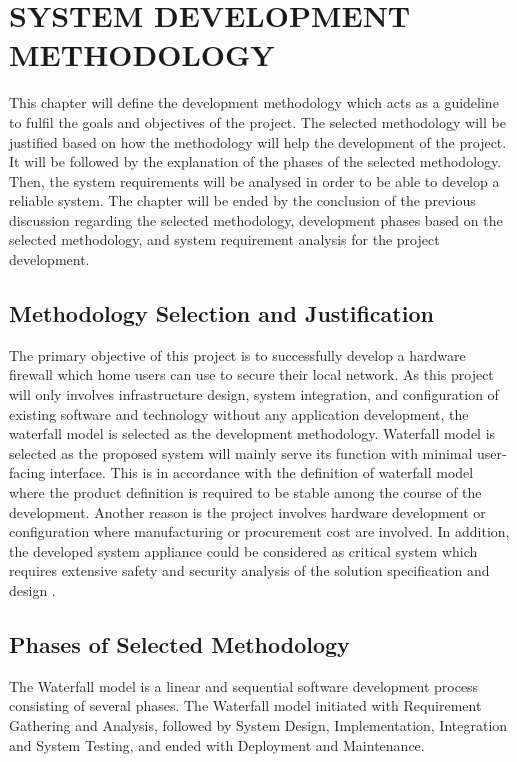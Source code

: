 \documentclass[../index.tex]{subfiles}
\begin{document}
\chapter{SYSTEM DEVELOPMENT METHODOLOGY}

This chapter will define the development methodology which acts as a guideline to fulfil the goals
and objectives of the project. The selected methodology will be justified based on how the
methodology will help the development of the project. It will be followed by the explanation of the
phases of the selected methodology. Then, the system requirements will be analysed in order to be
able to develop a reliable system. The chapter will be ended by the conclusion of the previous
discussion regarding the selected methodology, development phases based on the selected methodology,
and system requirement analysis for the project development.

\section{Methodology Selection and Justification}

The primary objective of this project is to successfully develop a hardware firewall which home
users can use to secure their local network. As this project will only involves infrastructure
design, system integration, and configuration of existing software and technology without any
application development, the waterfall model is selected as the development methodology. Waterfall
model is selected as the proposed system will mainly serve its function with minimal user-facing
interface. This is in accordance with the definition of waterfall model where the product definition
is required to be stable among the course of the development. Another reason is the project involves
hardware development or configuration where manufacturing or procurement cost are involved. In
addition, the developed system appliance could be considered as critical system which requires
extensive safety and security analysis of the solution specification and design
\cite{balaji2012waterfall}.

\section{Phases of Selected Methodology}

The Waterfall model is a linear and sequential software development process consisting of several
phases. The Waterfall model initiated with Requirement Gathering and Analysis, followed by System
Design, Implementation, Integration and System Testing, and ended with Deployment and Maintenance.
\end{document}
